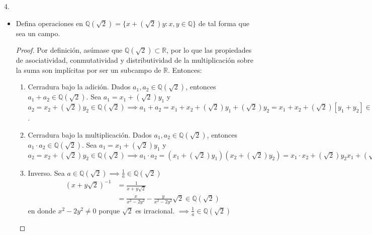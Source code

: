 \documentclass[a4paper,12pt]{article}
\begin{document}
4.\newline
\begin{itemize}
    \item Defina operaciones en $\mathbb{Q}(\sqrt{2})=\{x+(\sqrt{2}) y: x, y \in\mathbb{Q}\}$ de tal forma que sea un campo.
    \begin{proof}
    Por definición, asúmase que $\mathbb{Q}(\sqrt{2})\subset \mathbb{R}$, por lo que las propiedades de asociatividad, conmutatividad  y distributividad de la multiplicación sobre la suma son implícitas por ser un subcampo de $\mathbb{R}$. Entonces: 
    \begin{enumerate}
        \item {Cerradura bajo la adición.} Dados $a_1,a_2\in \mathbb{Q}(\sqrt{2})$, entonces $a_1+a_2 \in \mathbb{Q}(\sqrt{2})$.\newline \newline 
        Sea $a_1= x_1+(\sqrt{2})y_1$ y $a_2= x_2+(\sqrt{2})y_2\in\mathbb{Q}(\sqrt{2}) \implies a_1+a_2 = x_1+x_2 +(\sqrt{2})y_1+(\sqrt{2})y_2=x_1+x_2+(\sqrt{2})[y_1+y_2]\in \mathbb{Q}(\sqrt{2})$.
        
        \item {Cerradura bajo la multiplicación.} Dados $a_1,a_2\in \mathbb{Q}(\sqrt{2})$, entonces $a_1\cdot a_2 \in \mathbb{Q}(\sqrt{2})$.\newline\newline 
         Sea $a_1= x_1+(\sqrt{2})y_1$ y $a_2= x_2+(\sqrt{2})y_2\in\mathbb{Q}(\sqrt{2}) \implies a_1\cdot a_2 = (x_1+(\sqrt{2})y_1)(x_2+(\sqrt{2})y_2)= x_1\cdot x_2 +(\sqrt{2})y_2x_1 +(\sqrt{2})y_1x_2 +(\sqrt{2}y_1)\cdot(\sqrt{2}y_2) = x_1\cdot x_2 +(\sqrt{2})[y_2x_1 +y_1x_2] +2(y_1y_2)\in \mathbb{Q}(\sqrt{2})$
        \item {Inverso.}  Sea $a \in \mathbb{Q}(\sqrt{2})\implies \frac{1}{a} \in \mathbb{Q}(\sqrt{2}) $ \newline \newline 
        $$
\begin{aligned}
(x+y \sqrt{2})^{-1} &=\frac{1}{x+y \sqrt{2}} \\
&=\frac{x}{x^{2}-2 y^{2}}-\frac{y}{x^{2}-2 y^{2}} \sqrt{2} \in \mathbb{Q}(\sqrt{2})
\end{aligned}
$$
en donde $x^{2}-2 y^{2} \neq 0$ porque $\sqrt{2}$ es irracional. $\implies \frac{1}{a}\in \mathbb{Q}(\sqrt{2})$
        
    \end{enumerate}
    

\end{proof}
\end{itemize}
\end{document}
